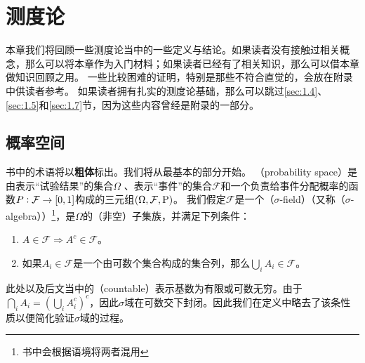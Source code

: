 \documentclass[../main.tex]{subfiles}
\begin{document}
\chapter{测度论}
本章我们将回顾一些测度论当中的一些定义与结论。如果读者没有接触过相关概念，那么可以将本章作为入门材料；如果读者已经有了相关知识，那么可以借本章做知识回顾之用。
一些比较困难的证明，特别是那些不符合直觉的，会放在附录中供读者参考。
如果读者拥有扎实的测度论基础，那么可以跳过\ref{sec:1.4}、\ref{sec:1.5}和\ref{sec:1.7}节，因为这些内容曾经是附录的一部分。

\section{概率空间} \label{sec:1.1}
书中的术语将以\textbf{粗体}标出。我们将从最基本的部分开始。
（probability space）是由表示``试验结果''的集合\(\Omega\) 、表示``事件''的集合\(\mathcal{F}\)和一个负责给事件分配概率的函数\(P:\mathcal{F} \rightarrow \intcc{0, 1}\)构成的三元组\((\Omega, \mathcal{F}, \operatorname{\mathrm{P}})\)。
我们假定\(\mathcal{F}\)是一个（\(\sigma\)-field）（又称（\(\sigma\)-algebra））\footnote{书中会根据语境将两者混用}，是\(\Omega\)的（非空）子集族，并满足下列条件：
\begin{enumerate}
	\item \(A \in \mathcal{F} \Rightarrow A^c \in \mathcal{F}\)。
	\item \label{def:measure:2} 如果\(A_i \in \mathcal{F}\)是一个由可数个集合构成的集合列，那么\(\bigcup_i A_i \in \mathcal{F}\)。
\end{enumerate}

此处以及后文当中的（countable）表示基数为有限或可数无穷。由于\(\bigcap_i A_i = (\bigcup_i A_i^c)^c\)，因此\(\sigma\)域在可数交下封闭。因此我们在定义中略去了该条性质以便简化验证\(\sigma\)域的过程。
\end{document}
